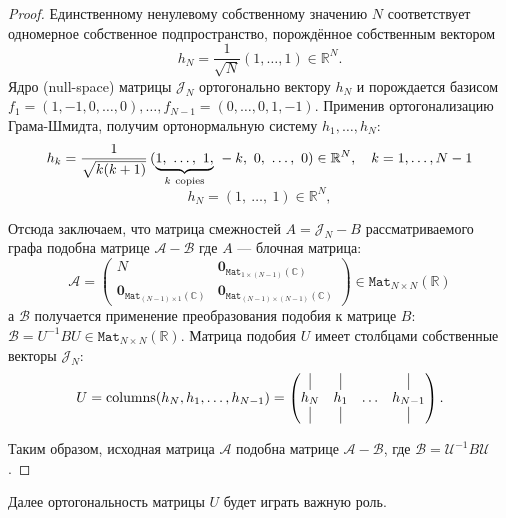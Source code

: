 \documentclass[14pt,a4paper]{extarticle}
\theoremstyle{definition}
\begin{document}
\begin{proof}
  Единственному ненулевому собственному значению \( N \) соответствует
  одномерное собственное подпространство, порождённое собственным вектором
  \[
    h_N = \frac{1}{\sqrt{N}} \left(1, \ldots, 1\right)\in\mathbb{R}^N.
  \]
  Ядро (null-space) матрицы \( \mathcal{J}_N \) ортогонально вектору \( h_N \)
  и порождается базисом
  \( f_1 = {\left(1,-1,0,\ldots,0\right)}, \ldots,
     f_{N-1} = {\left(0,\ldots,0,1,-1\right)}. \)
  Применив ортогонализацию Грама-Шмидта, получим ортонормальную систему \( h_1, \ldots, h_N \):
    \[
        h_k = \frac{1}{\sqrt{k(k+1)}}
            \left(\smash{\underbrace{1,~\ldots,~1,}_{k\ \text{copies}}}~-k,~0,~\ldots,~0\right)
            \in \mathbb{R}^N, \quad k={1, \ldots, N-1} \]
    \[
        h_N = {\left(1,~\ldots,~1\right)} \in \mathbb{R}^N, \]

Отсюда заключаем, что матрица смежностей \( A = \mathcal{J}_N - B \)
рассматриваемого графа подобна матрице
    \( \mathcal{A} - \mathcal{B} \)
    где \( A \) --- блочная матрица:
    \[
        \mathcal{A} = \left(\begin{array}{c|c}
        N & \mathbf{0}_{\mathtt{Mat}_{1{\times}(N{-}1)}(\mathbb{C})}\\ \hline
            \mathbf{0}_{\mathtt{Mat}_{(N{-}1){\times}1}(\mathbb{C})} & \mathbf{0}_{\mathtt{Mat}_{(N{-}1){\times}(N{-}1)}(\mathbb{C})}
        \end{array}\right) \in \mathtt{Mat}_{N{\times}N}(\mathbb{R})
    \]
    а \( \mathcal{B} \) получается применение преобразования подобия к матрице
    \( B \):
    \(
        \mathcal{B} = U^{-1} B U \in \mathtt{Mat}_{N{\times}N}(\mathbb{R}).
    \)
Матрица подобия \( U \) имеет столбцами собственные векторы \( \mathcal{J}_N \):
    \[
        U = \operatorname{columns}(h_N, h_1, \ldots, h_{N-1}) =
        \begin{pmatrix}
            \vline & \vline &        & \vline \\
            h_N    & h_1    & \ldots & h_{N-1} \\
            \vline & \vline &        & \vline

        \end{pmatrix}.
    \]


Таким образом, исходная матрица \( \mathcal{A} \) подобна матрице
\( \mathcal{A} - \mathcal{B} \), где \( \mathcal{B} = \mathcal{U}^{-1} B \mathcal{U} \).
\end{proof}

Далее ортогональность матрицы \( U \) будет играть важную роль.
\end{document}
